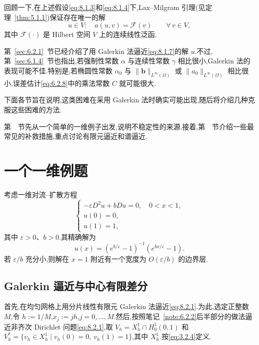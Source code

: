 回顾一下,在上述假设\eqref{eq:8.1.3}和\eqref{eq:8.1.4}下,Lax--Milgram 引理(见定理~\ref{thm:5.1.1})保证存在唯一的解
\begin{equation}\label{eq:8.1.7}
  u\in V:\quad a(u,v)=\mathcal F(v)\qquad\forall\,v\in V,
\end{equation}
其中 \(\mathcal F(\cdot)\) 是 Hilbert 空间 \(V\) 上的连续线性泛函.

第~\ref{sec:6.2.1}~节已经介绍了用 Galerkin 法逼近\eqref{eq:8.1.7}的解 \(u\).不过,第~\ref{sec:6.1.4}~节也指出,若强制性常数 \(\alpha\) 与连续性常数 \(\gamma\) 相比很小,Galerkin 法的表现可能不佳.特别是,若椭圆性常数 \(\alpha_0\) 与 \(\|\boldsymbol{b}\|_{L^\infty(\Omega)}\) 或 \(\|a_0\|_{L^\infty(\Omega)}\) 相比很小,误差估计\eqref{eq:6.2.8}中的乘法常数 \(C\) 就可能很大.

下面各节旨在说明,这类困难在采用 Galerkin 法时确实可能出现,随后将介绍几种克服这些困难的方法.

第~~节先从一个简单的一维例子出发,说明不稳定性的来源.接着,第~~节介绍一些最常见的补救措施,重点讨论有限元逼近和谱逼近.

\section{一个一维例题}\label{sec:8.2}

\begin{example}\label{ex:8.2-model}
考虑一维对流--扩散方程
\begin{equation}\label{eq:8.2.1}
  \begin{cases}
    -\varepsilon D^2u+bDu=0,\quad 0<x<1,\\
    u(0)=0,\\
    u(1)=1,
  \end{cases}
\end{equation}
其中 \(\varepsilon>0\)、\(b>0\).其精确解为
\[
  u(x)=(e^{b/\varepsilon}-1)^{-1}(e^{bx/\varepsilon}-1).
\]
若 \(\varepsilon/b\) 充分小,则解在 \(x=1\) 附近有一个宽度为 \(O(\varepsilon/b)\) 的边界层.
\end{example}

\subsection{Galerkin 逼近与中心有限差分}\label{sec:8.2.1}

首先,在均匀网格上用分片线性有限元 Galerkin 法逼近\eqref{eq:8.2.1}\@.为此,选定正整数 \(M\),令 \(h:=1/M\),\(x_j:=jh\),\(j=0,\ldots,M\).然后,按照笔记~\ref{note:6.2.2}后半部分的做法逼近非齐次 Dirichlet 问题\eqref{eq:8.2.1},取 \(V_h=X_h^1\cap H_0^1(0,1)\) 和 \(V_h^*=\{v_h\in X_h^1\mid v_h(0)=0,\ v_h(1)=1\}\),其中 \(X_h^1\) 按\eqref{eq:3.2.4}定义.

